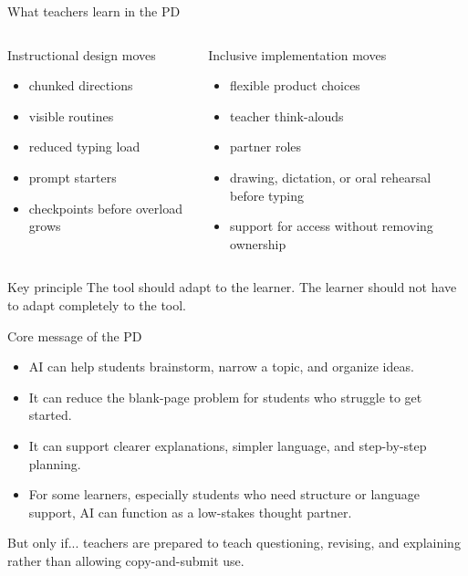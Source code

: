 \documentclass[aspectratio=169,11pt]{beamer}
\begin{document}
\begin{frame}{What teachers learn in the PD}
\begin{columns}[T]
  \begin{block}{Instructional design moves}
  \begin{itemize}
    \item chunked directions
    \item visible routines
    \item reduced typing load
    \item prompt starters
    \item checkpoints before overload grows
  \end{itemize}
  \end{block}

  \begin{block}{Inclusive implementation moves}
  \begin{itemize}
    \item flexible product choices
    \item teacher think-alouds
    \item partner roles
    \item drawing, dictation, or oral rehearsal before typing
    \item support for access without removing ownership
  \end{itemize}
  \end{block}
\end{columns}

\vspace{0.2cm}
\begin{alertblock}{Key principle}
The tool should adapt to the learner. The learner should not have to adapt completely to the tool.
\end{alertblock}
\end{frame}

\begin{frame}{Core message of the PD}
\begin{itemize}
  \item AI can help students brainstorm, narrow a topic, and organize ideas.
  \item It can reduce the blank-page problem for students who struggle to get started.
  \item It can support clearer explanations, simpler language, and step-by-step planning.
  \item For some learners, especially students who need structure or language support, AI can function as a low-stakes thought partner.
\end{itemize}

\vspace{0.25cm}
\begin{block}{But only if...}
\large teachers are prepared to teach questioning, revising, and explaining rather than allowing copy-and-submit use.
\end{block}
\end{frame}
\end{document}
